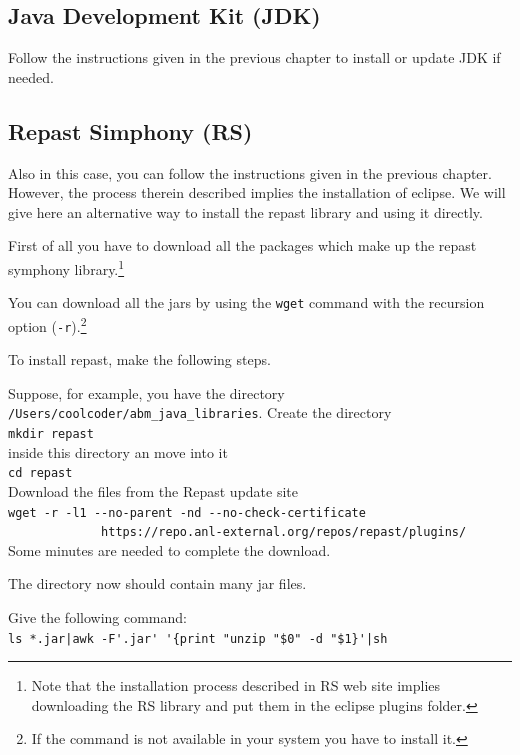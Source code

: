 \documentclass{book}
\begin{document}
\subsection{Java Development Kit (JDK)}
Follow the instructions given in the previous chapter to install or update JDK if needed. 
\subsection{Repast Simphony (RS)}
Also in this case, you can follow the instructions given in the previous chapter. However, the process therein described implies the installation of eclipse. We will give here an alternative way to install the repast library and using it directly.

First of all you have to download all the packages which make up the repast symphony library.\footnote{Note that the installation process described in RS web site implies downloading the RS library and put them in the eclipse plugins folder.}

You can download all the jars by using the \verb+wget+ command with the recursion option (\verb+-r+).\footnote{If the command is not available in your system you have to install it.}

To install repast, make the following steps.

Suppose, for example, you have the directory \verb+/Users/coolcoder/abm_java_libraries+. Create the directory\\
\verb+mkdir repast+\\
inside this directory an move into it\\
\verb+cd repast+\\

Download the files from the Repast update site\\
\verb+wget -r -l1 --no-parent -nd --no-check-certificate +\\
\verb+             https://repo.anl-external.org/repos/repast/plugins/+\\

Some minutes are needed to complete the download.%

The directory now should contain many jar files.

Give the following command:\\
\verb+ls *.jar|awk -F'.jar' '{print "unzip "$0" -d "$1}'|sh+
\end{document}
